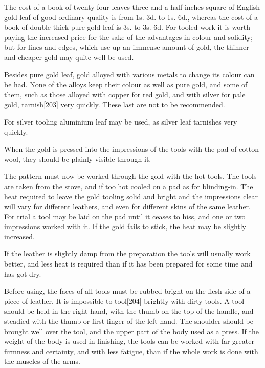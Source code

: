 \documentclass[
]{article}
\begin{document}
The cost of a book of twenty-four leaves three and a half inches square
of English gold leaf of good ordinary quality is from 1s. 3d. to 1s.
6d., whereas the cost of a book of double thick pure gold leaf is 3s. to
3s. 6d. For tooled work it is worth paying the increased price for the
sake of the advantages in colour and solidity; but for lines and edges,
which use up an immense amount of gold, the thinner and cheaper gold may
quite well be used.

Besides pure gold leaf, gold alloyed with various metals to change its
colour can be had. None of the alloys keep their colour as well as pure
gold, and some of them, such as those alloyed with copper for red gold,
and with silver for pale gold,
tarnish{\protect\hypertarget{Page_203}{}{{[}203{]}}} very quickly. These
last are not to be recommended.

For silver tooling aluminium leaf may be used, as silver leaf tarnishes
very quickly.

When the gold is pressed into the impressions of the tools with the pad
of cotton-wool, they should be plainly visible through it.

The pattern must now be worked through the gold with the hot tools. The
tools are taken from the stove, and if too hot cooled on a pad as for
blinding-in. The heat required to leave the gold tooling solid and
bright and the impressions clear will vary for different leathers, and
even for different skins of the same leather. For trial a tool may be
laid on the pad until it ceases to hiss, and one or two impressions
worked with it. If the gold fails to stick, the heat may be slightly
increased.

If the leather is slightly damp from the preparation the tools will
usually work better, and less heat is required than if it has been
prepared for some time and has got dry.

Before using, the faces of all tools must be rubbed bright on the flesh
side of a piece of leather. It is impossible to
tool{\protect\hypertarget{Page_204}{}{{[}204{]}}} brightly with dirty
tools. A tool should be held in the right hand, with the thumb on the
top of the handle, and steadied with the thumb or first finger of the
left hand. The shoulder should be brought well over the tool, and the
upper part of the body used as a press. If the weight of the body is
used in finishing, the tools can be worked with far greater firmness and
certainty, and with less fatigue, than if the whole work is done with
the muscles of the arms.
\end{document}
